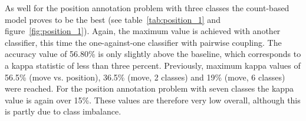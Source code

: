 \documentclass[article,type=msc,colorback,accentcolor=tud7b]{tudthesis}
\begin{document}
As well for the position annotation problem with three classes the count-based model proves to be the best (see table~\ref{tab:position_1} and figure~\ref{fig:position_1}). Again, the maximum value is achieved with another classifier, this time the one-against-one classifier with pairwise coupling. The accuracy value of 56.80\% is only slightly above the baseline, which corresponds to a kappa statistic of less than three percent. Previously, maximum kappa values of 56.5\% (move vs. position), 36.5\% (move, 2 classes) and 19\% (move, 6 classes) were reached. For the position annotation problem with seven classes the kappa value is again over 15\%. These values are therefore very low overall, although this is partly due to class imbalance.

    \begin{figure}[H]
      \begin{floatrow}
\end{floatrow}
\end{figure}
\end{document}
